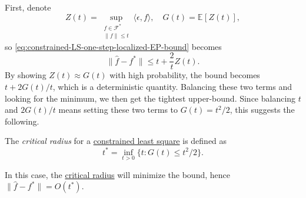 First, denote
\[
	Z(t) = \sup _{\substack{f\in \mathscr{F} ^{\ast} \\ \lVert f \rVert \leq t}} \langle \epsilon , f \rangle
	,\quad G(t) = \mathbb{E}_{}\left[Z(t) \right],
\]
so \autoref{eq:constrained-LS-one-step-localized-EP-bound} becomes
\begin{equation}\label{eq:constrained-LS-one-step-localized-EP-bound-reduced}
	\lVert \hat{f} - f^{\ast} \rVert \leq t + \frac{2}{t} Z(t).
\end{equation}
By showing \(Z(t) \approx G(t)\) with high probability, the bound becomes \(t + 2 G(t) / t\), which is a deterministic quantity. Balancing these two terms and looking for the minimum, we then get the tightest upper-bound. Since balancing \(t\) and \(2G(t) / t\) means setting these two terms to \(G(t) = t^2 / 2\), this suggests the following.

\begin{definition}\label{def:critical-radius}
	The \emph{critical radius} for a \hyperref[prb:constrained-LS]{constrained least square} is defined as
	\[
		t^{\ast} = \inf _{t > 0} \{ t \colon G(t) \leq t^2 / 2 \} .
	\]
\end{definition}

In this case, the \hyperref[def:critical-radius]{critical radius} will minimize the bound, hence \(\lVert \hat{f} - f^{\ast} \rVert = O(t^{\ast} )\).